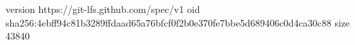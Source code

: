 version https://git-lfs.github.com/spec/v1
oid sha256:4ebff94c81b3289ffdaad65a76bfcf0f2b0e370fe7bbe5d689406c0d4ca30c88
size 43840

